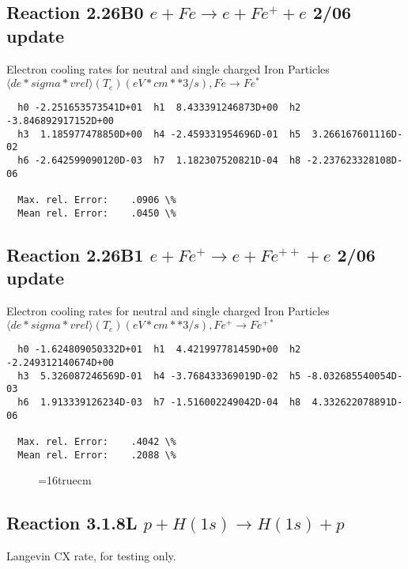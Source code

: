 \documentclass[12pt,dvipdfmx]{article}
\begin{document}
\subsection{
Reaction 2.26B0 $e + Fe  \rightarrow e + Fe^+  + e$ 2/06 update
}

  Electron cooling rates for neutral and single
  charged Iron Particles
 $ \langle de*sigma*vrel \rangle(T_e)  (eV*cm**3/s), Fe  \rightarrow Fe^* $

\begin{small}\begin{verbatim}
  h0 -2.251653573541D+01  h1  8.433391246873D+00  h2 -3.846892917152D+00
  h3  1.185977478850D+00  h4 -2.459331954696D-01  h5  3.266167601116D-02
  h6 -2.642599090120D-03  h7  1.182307520821D-04  h8 -2.237623328108D-06

  Max. rel. Error:    .0906 \%
  Mean rel. Error:    .0450 \%

\end{verbatim}\end{small}


\subsection{
Reaction 2.26B1 $e + Fe^+ \rightarrow e + Fe^{++} + e$ 2/06 update
}

  Electron cooling rates for neutral and single
  charged Iron Particles
 $  \langle de*sigma*vrel \rangle(T_e)  (eV*cm**3/s), Fe^+ \rightarrow Fe^{+*} $

\begin{small}\begin{verbatim}
  h0 -1.624809050332D+01  h1  4.421997781459D+00  h2 -2.249312140674D+00
  h3  5.326087246569D-01  h4 -3.768433369019D-02  h5 -8.032685540054D-03
  h6  1.913339126234D-03  h7 -1.516002249042D-04  h8  4.332622078891D-06

  Max. rel. Error:    .4042 \%
  Mean rel. Error:    .2088 \%

\end{verbatim}\end{small}

\begin{figure} \label{2.26Bl}
\epsfxsize=16truecm
\end{figure}
\newpage


\subsection{
Reaction 3.1.8L  $p + H(1s)  \rightarrow  H(1s) + p $
}
Langevin CX rate, for testing only.
\end{document}
